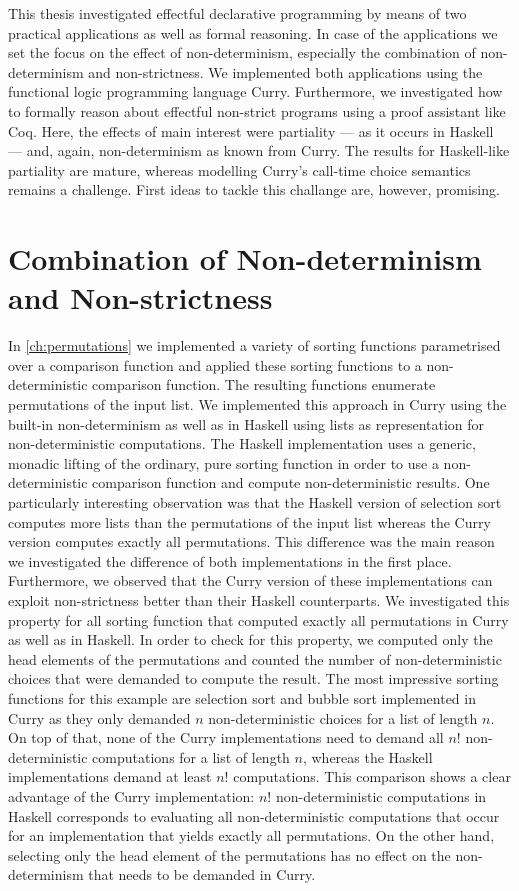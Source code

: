 %

This thesis investigated effectful declarative programming by means of two practical applications as well as formal reasoning.
In case of the applications we set the focus on the effect of non-determinism, especially the combination of non-determinism and non-strictness.
We implemented both applications using the functional logic programming language Curry.
Furthermore, we investigated how to formally reason about effectful non-strict programs using a proof assistant like Coq.
Here, the effects of main interest were partiality --- as it occurs in Haskell --- and, again, non-determinism as known from Curry.
The results for Haskell-like partiality are mature, whereas modelling Curry's call-time choice semantics remains a challenge.
First ideas to tackle this challange are, however, promising.

\section{Combination of Non-determinism and Non-strictness}

In \autoref{ch:permutations} we implemented a variety of sorting functions parametrised over a comparison function and applied these sorting functions to a non-deterministic comparison function.
The resulting functions enumerate permutations of the input list.
We implemented this approach in Curry using the built-in non-determinism as well as in Haskell using lists as representation for non-deterministic computations.
The Haskell implementation uses a generic, monadic lifting of the ordinary, pure sorting function in order to use a non-deterministic comparison function and compute non-deterministic results.
One particularly interesting observation was that the Haskell version of selection sort computes more lists than the permutations of the input list whereas the Curry version computes exactly all permutations.
This difference was the main reason we investigated the difference of both implementations in the first place.
Furthermore, we observed that the Curry version of these implementations can exploit non-strictness better than their Haskell counterparts.
We investigated this property for all sorting function that computed exactly all permutations in Curry as well as in Haskell.
In order to check for this property, we computed only the head elements of the permutations and counted the number of non-deterministic choices that were demanded to compute the result.
The most impressive sorting functions for this example are selection sort and bubble sort implemented in Curry as they only demanded $n$ non-deterministic choices for a list of length $n$.
On top of that, none of the Curry implementations need to demand all $n!$ non-deterministic computations for a list of length $n$, whereas the Haskell implementations demand at least $n!$ computations.
This comparison shows a clear advantage of the Curry implementation: $n!$ non-deterministic computations in Haskell corresponds to evaluating all non-deterministic computations that occur for an implementation that yields exactly all permutations.
On the other hand, selecting only the head element of the permutations has no effect on the non-determinism that needs to be demanded in Curry.

